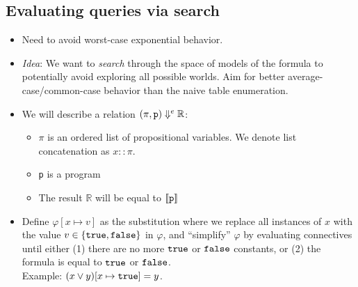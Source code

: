 \documentclass{tufte-handout}
\begin{document}
\subsection{Evaluating queries via search}
\begin{itemize}
  \item Need to avoid worst-case exponential behavior.
  \item \emph{Idea}: We want to \emph{search} through the space of models of
  the formula to potentially avoid exploring all possible worlds. Aim for better 
  average-case/common-case behavior than the naive table enumeration.
    

    \item We will describe a relation $(\pi, \texttt{p}) \Downarrow^e \mathbb{R}$:
    \begin{itemize}[noitemsep]
        \item $\pi$ is an ordered list of propositional variables. We denote 
        list concatenation as $x::\pi$. 
        \item \texttt{p} is a \prop{} program
        \item The result $\mathbb{R}$ will be equal to $\llbracket {\texttt{p}} \rrbracket$
    \end{itemize}

    \item Define $\varphi[x \mapsto v]$ as the substitution where we replace all
    instances of $x$ with the value $v \in \{\texttt{true}, \texttt{false}\}$ in $\varphi$, and
    ``simplify'' $\varphi$ by evaluating connectives until either (1) there are no more 
    $\texttt{true}$ or $\texttt{false}$ constants, or (2) the formula is equal to $\texttt{true}$ or $\texttt{false}$. 
    \\
    Example: $(x \lor y)[x \mapsto \texttt{true}] = y$.


\end{itemize}
\end{document}
